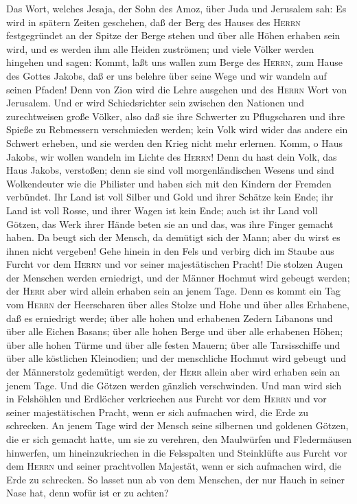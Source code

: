  Das Wort, welches Jesaja, der Sohn des Amoz, über Juda
und Jerusalem sah:  Es wird in spätern Zeiten geschehen,
daß der Berg des Hauses des \textsc{Herrn} festgegründet an der Spitze
der Berge stehen und über alle Höhen erhaben sein wird, und es werden
ihm alle Heiden zuströmen;  und viele Völker werden
hingehen und sagen: Kommt, laßt uns wallen zum Berge des \textsc{Herrn},
zum Hause des Gottes Jakobs, daß er uns belehre über seine Wege und wir
wandeln auf seinen Pfaden! Denn von Zion wird die Lehre ausgehen und des
\textsc{Herrn} Wort von Jerusalem.  Und er wird
Schiedsrichter sein zwischen den Nationen und zurechtweisen große
Völker, also daß sie ihre Schwerter zu Pflugscharen und ihre Spieße zu
Rebmessern verschmieden werden; kein Volk wird wider das andere ein
Schwert erheben, und sie werden den Krieg nicht mehr erlernen.
 Komm, o Haus Jakobs, wir wollen wandeln im Lichte des
\textsc{Herrn}!  Denn du hast dein Volk, das Haus Jakobs,
verstoßen; denn sie sind voll morgenländischen Wesens und sind
Wolkendeuter wie die Philister und haben sich mit den Kindern der
Fremden verbündet.  Ihr Land ist voll Silber und Gold und
ihrer Schätze kein Ende; ihr Land ist voll Rosse, und ihrer Wagen ist
kein Ende;  auch ist ihr Land voll Götzen, das Werk ihrer
Hände beten sie an und das, was ihre Finger gemacht haben.
 Da beugt sich der Mensch, da demütigt sich der Mann; aber
du wirst es ihnen nicht vergeben!  Gehe hinein in den
Fels und verbirg dich im Staube aus Furcht vor dem \textsc{Herrn} und
vor seiner majestätischen Pracht!  Die stolzen Augen der
Menschen werden erniedrigt, und der Männer Hochmut wird gebeugt werden;
der \textsc{Herr} aber wird allein erhaben sein an jenem Tage.
 Denn es kommt ein Tag vom \textsc{Herrn} der Heerscharen
über alles Stolze und Hohe und über alles Erhabene, daß es erniedrigt
werde;  über alle hohen und erhabenen Zedern Libanons und
über alle Eichen Basans;  über alle hohen Berge und über
alle erhabenen Höhen;  über alle hohen Türme und über
alle festen Mauern;  über alle Tarsisschiffe und über
alle köstlichen Kleinodien;  und der menschliche Hochmut
wird gebeugt und der Männerstolz gedemütigt werden, der \textsc{Herr}
allein aber wird erhaben sein an jenem Tage.  Und die
Götzen werden gänzlich verschwinden.  Und man wird sich
in Felshöhlen und Erdlöcher verkriechen aus Furcht vor dem
\textsc{Herrn} und vor seiner majestätischen Pracht, wenn er sich
aufmachen wird, die Erde zu schrecken.  An jenem Tage
wird der Mensch seine silbernen und goldenen Götzen, die er sich gemacht
hatte, um sie zu verehren, den Maulwürfen und Fledermäusen hinwerfen,
 um hineinzukriechen in die Felsspalten und Steinklüfte
aus Furcht vor dem \textsc{Herrn} und seiner prachtvollen Majestät, wenn
er sich aufmachen wird, die Erde zu schrecken.  So lasset
nun ab von dem Menschen, der nur Hauch in seiner Nase hat, denn wofür
ist er zu achten?

